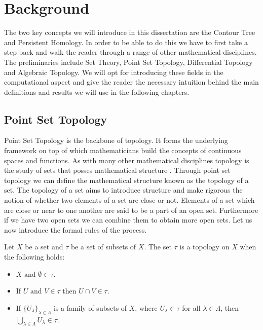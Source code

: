 \chapter{Background}
\label{chapter2}

The two key concepts we will introduce in this dissertation are the Contour Tree and Persistent Homology. In order to be able to do this we have to first take a step back and walk the reader through a range of other mathematical disciplines. The preliminaries include Set Theory, Point Set Topology, Differential Topology and Algebraic Topology. We will opt for introducing these fields in the computational aspect and give the reader the necessary intuition behind the main definitions and results we will use in the following chapters.


\section{Point Set Topology}

Point Set Topology is the backbone of topology. It forms the underlying framework on top of which mathematicians build the concepts of continuous spaces and functions. As with many other mathematical disciplines topology is the study of sets that posses mathematical structure \cite{intro-topo}. Through point set topology we can define the mathematical structure known as the topology of a set. The topology of a set aims to introduce structure and make rigorous the notion of whether two elements of a set are close or not. Elements of a set which are close or near to one another are said to be a part of an open set. Furthermore if we have two open sets we can combine them to obtain more open sets. Let us now introduce the formal rules of the process.

\begin{defn} Let $X$ be a set and $\tau$ be a set of subsets of $X$. The set $\tau$ is a topology on $X$ when the following holds:  \end{defn}

\begin{itemize}
    \item $X \text{ and } \emptyset \in \tau$.
    \item If $U \text{ and } V \in \tau$ then $U \cap V \in \tau$.
    \item If $\{U_\lambda\}_{\lambda \in \Lambda}$ is a family of subsets of $X$, where $U_\lambda \in \tau$ for all $\lambda \in \Lambda$, then 
        $\bigcup_{\lambda \in \Lambda}{U_\lambda} \in \tau$.
\end{itemize}

